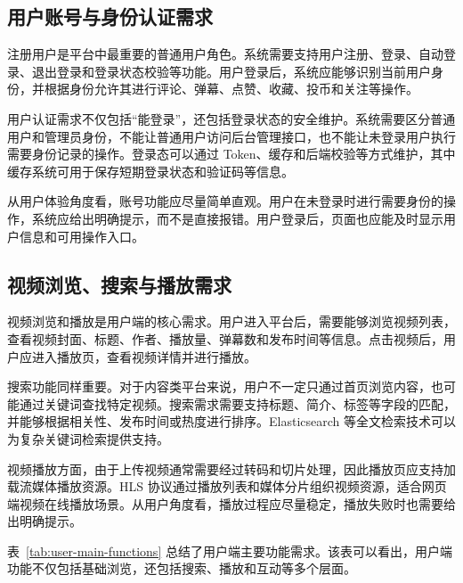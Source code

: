 \subsection{用户账号与身份认证需求}
\label{subsec:user-auth-requirements}

注册用户是平台中最重要的普通用户角色。系统需要支持用户注册、登录、自动登录、退出登录和登录状态校验等功能。用户登录后，系统应能够识别当前用户身份，并根据身份允许其进行评论、弹幕、点赞、收藏、投币和关注等操作。

用户认证需求不仅包括“能登录”，还包括登录状态的安全维护。系统需要区分普通用户和管理员身份，不能让普通用户访问后台管理接口，也不能让未登录用户执行需要身份记录的操作。登录态可以通过 Token、缓存和后端校验等方式维护，其中缓存系统可用于保存短期登录状态和验证码等信息\cite{redisdocs}。

从用户体验角度看，账号功能应尽量简单直观。用户在未登录时进行需要身份的操作，系统应给出明确提示，而不是直接报错。用户登录后，页面也应能及时显示用户信息和可用操作入口。

\subsection{视频浏览、搜索与播放需求}
\label{subsec:video-browse-search-play}

视频浏览和播放是用户端的核心需求。用户进入平台后，需要能够浏览视频列表，查看视频封面、标题、作者、播放量、弹幕数和发布时间等信息。点击视频后，用户应进入播放页，查看视频详情并进行播放。

搜索功能同样重要。对于内容类平台来说，用户不一定只通过首页浏览内容，也可能通过关键词查找特定视频。搜索需求需要支持标题、简介、标签等字段的匹配，并能够根据相关性、发布时间或热度进行排序。Elasticsearch 等全文检索技术可以为复杂关键词检索提供支持\cite{elasticsearchdocs}。

视频播放方面，由于上传视频通常需要经过转码和切片处理，因此播放页应支持加载流媒体播放资源。HLS 协议通过播放列表和媒体分片组织视频资源，适合网页端视频在线播放场景\cite{rfc8216hls}。从用户角度看，播放过程应尽量稳定，播放失败时也需要给出明确提示。

表~\ref{tab:user-main-functions} 总结了用户端主要功能需求。该表可以看出，用户端功能不仅包括基础浏览，还包括搜索、播放和互动等多个层面。

